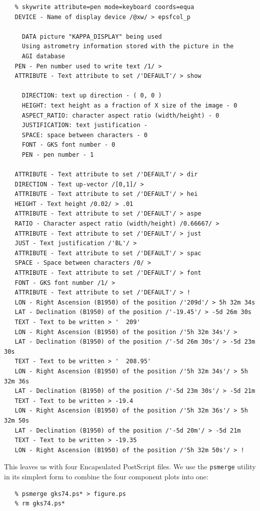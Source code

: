 \documentclass[11pt]{article}
\newcommand{\xref}[3]{#1}
\begin{document}
\begin{verbatim}
   % skywrite attribute=pen mode=keyboard coords=equa
   DEVICE - Name of display device /@xw/ > epsfcol_p

     DATA picture "KAPPA_DISPLAY" being used
     Using astrometry information stored with the picture in the
     AGI database
   PEN - Pen number used to write text /1/ >
   ATTRIBUTE - Text attribute to set /'DEFAULT'/ > show

     DIRECTION: text up direction - ( 0, 0 )
     HEIGHT: text height as a fraction of X size of the image - 0
     ASPECT_RATIO: character aspect ratio (width/height) - 0
     JUSTIFICATION: text justification -
     SPACE: space between characters - 0
     FONT - GKS font number - 0
     PEN - pen number - 1

   ATTRIBUTE - Text attribute to set /'DEFAULT'/ > dir
   DIRECTION - Text up-vector /[0,1]/ >
   ATTRIBUTE - Text attribute to set /'DEFAULT'/ > hei
   HEIGHT - Text height /0.02/ > .01
   ATTRIBUTE - Text attribute to set /'DEFAULT'/ > aspe
   RATIO - Character aspect ratio (width/height) /0.66667/ >
   ATTRIBUTE - Text attribute to set /'DEFAULT'/ > just
   JUST - Text justification /'BL'/ >
   ATTRIBUTE - Text attribute to set /'DEFAULT'/ > spac
   SPACE - Space between characters /0/ >
   ATTRIBUTE - Text attribute to set /'DEFAULT'/ > font
   FONT - GKS font number /1/ >
   ATTRIBUTE - Text attribute to set /'DEFAULT'/ > !
   LON - Right Ascension (B1950) of the position /'209d'/ > 5h 32m 34s
   LAT - Declination (B1950) of the position /'-19.45'/ > -5d 26m 30s
   TEXT - Text to be written > '  209'
   LON - Right Ascension (B1950) of the position /'5h 32m 34s'/ >
   LAT - Declination (B1950) of the position /'-5d 26m 30s'/ > -5d 23m 30s
   TEXT - Text to be written > '  208.95'
   LON - Right Ascension (B1950) of the position /'5h 32m 34s'/ > 5h 32m 36s
   LAT - Declination (B1950) of the position /'-5d 23m 30s'/ > -5d 21m
   TEXT - Text to be written > -19.4
   LON - Right Ascension (B1950) of the position /'5h 32m 36s'/ > 5h 32m 50s
   LAT - Declination (B1950) of the position /'-5d 20m'/ > -5d 21m
   TEXT - Text to be written > -19.35
   LON - Right Ascension (B1950) of the position /'5h 32m 50s'/ > !
\end{verbatim}

   This leaves us with four Encapsulated PostScript files. We use the
{\tt \xref{psmerge}{sun164}{}}
   utility in its simplest form to combine the four
   component plots into one:

\begin{verbatim}
   % psmerge gks74.ps* > figure.ps
   % rm gks74.ps*
\end{verbatim}
\end{document}

